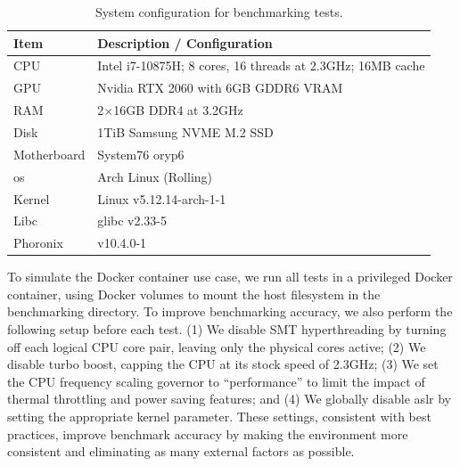 \begin{table}[htp]
  \centering
  \footnotesize
  \caption[System configuration for benchmarking tests]{System configuration for benchmarking tests.}%
  \label{tab:system-config}
  \begin{tabular}{ll}
  \toprule
  Item & Description / Configuration \\
  \midrule
  CPU & Intel i7-10875H; 8 cores, 16 threads at 2.3GHz; 16MB cache\\
  GPU & Nvidia RTX 2060 with 6GB GDDR6 VRAM \\
  RAM & 2$\times$16GB DDR4 at 3.2GHz \\
  Disk & 1TiB Samsung NVME M.2 SSD \\
  Motherboard & System76 oryp6 \\
  \midrule
  \gls{os} & Arch Linux (Rolling) \\
  Kernel & Linux v5.12.14-arch-1-1 \\
  Libc & glibc v2.33-5 \\
  Phoronix & v10.4.0-1 \\
  \bottomrule
  \end{tabular}
\end{table}

To simulate the Docker container use case, we run all tests in a privileged Docker
container, using Docker volumes to mount the host filesystem in the benchmarking
directory. To improve benchmarking accuracy, we also perform the following setup before
each test. (1) We disable SMT hyperthreading by turning off each logical CPU core pair,
leaving only the physical cores active; (2) We disable turbo boost, capping the CPU at its
stock speed of 2.3GHz; (3) We set the CPU frequency scaling governor to
\enquote{performance} to limit the impact of thermal throttling and power saving features;
and (4) We globally disable \gls{aslr} by setting the appropriate kernel parameter. These
settings, consistent with best practices, improve benchmark accuracy by making the
environment more consistent and eliminating as many external factors as possible.

